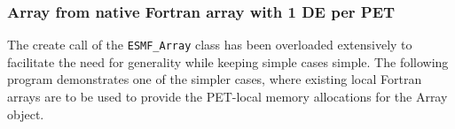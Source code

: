  
\setlength{\oldparskip}{\parskip}
\setlength{\parskip}{1.5ex}
\setlength{\oldparindent}{\parindent}
\setlength{\parindent}{0pt}
\setlength{\oldbaselineskip}{\baselineskip}
\setlength{\baselineskip}{11pt}
 
\def\bv{\begin{verbatim}}
\def\ev{\end{verbatim}}
\def\be{\begin{equation}}
\def\ee{\end{equation}}
\def\bea{\begin{eqnarray}}
\def\eea{\end{eqnarray}}
\def\bi{\begin{itemize}}
\def\ei{\end{itemize}}
\def\bn{\begin{enumerate}}
\def\en{\end{enumerate}}
\def\bd{\begin{description}}
\def\ed{\end{description}}
\def\({\left (}
\def\){\right )}
\def\[{\left [}
\def\]{\right ]}
\def\<{\left  \langle}
\def\>{\right \rangle}
\def\cI{{\cal I}}
\def\diag{\mathop{\rm diag}}
\def\tr{\mathop{\rm tr}}


 

   \subsubsection{Array from native Fortran array with 1 DE per PET}
   \label{Array_from_native_1_to_1}
   
   The create call of the {\tt ESMF\_Array} class has been overloaded
   extensively to facilitate the need for generality while keeping simple
   cases simple. The following program demonstrates one of the simpler
   cases, where existing local Fortran arrays are to be used to provide
   the PET-local memory allocations for the Array object.
   
